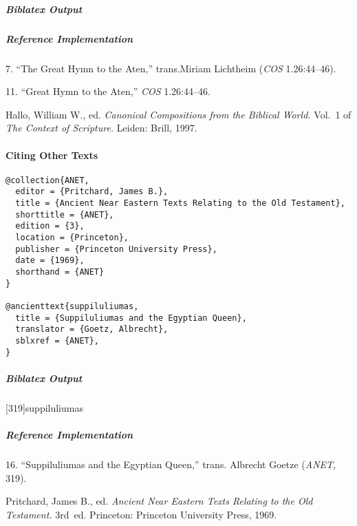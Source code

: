 \documentclass[a4paper]{article}
\newenvironment{biboutput}{%
  \subparagraph{Biblatex Output}
}{\color{black}}
\newenvironment{refimp}{%
  \subparagraph{Reference Implementation}
  \color{reference-colour}
  \rm
}{\par\color{black}}
\begin{document}
\begin{biboutput}
\end{biboutput}

\begin{refimp}
  \hspace*{\bibindent}7. “The Great Hymn to the Aten,” trans.\@ Miriam Lichtheim
  (\emph{COS} 1.26:44–46).

  \hspace*{\bibindent}11. “Great Hymn to the Aten,” \emph{COS} 1.26:44–46.

  \hangindent\bibindent Hallo, William W., ed. \emph{Canonical Compositions
  from the Biblical World.} Vol.~1 of \emph{The Context of Scripture.} Leiden:
  Brill, 1997.

\end{refimp}

\paragraph{Citing Other Texts}

\begin{lstlisting}
@collection{ANET,
  editor = {Pritchard, James B.},
  title = {Ancient Near Eastern Texts Relating to the Old Testament},
  shorttitle = {ANET},
  edition = {3},
  location = {Princeton},
  publisher = {Princeton University Press},
  date = {1969},
  shorthand = {ANET}
}

@ancienttext{suppiluliumas,
  title = {Suppiluliumas and the Egyptian Queen},
  translator = {Goetz, Albrecht},
  sblxref = {ANET},
}
\end{lstlisting}

\begin{biboutput}
  [319]{suppiluliumas}
\end{biboutput}

\begin{refimp}
  \hspace*{\bibindent}16. “Suppiluliumas and the Egyptian Queen,” trans.\@
  Albrecht Goetze (\emph{ANET,} 319).

  \hangindent\bibindent Pritchard, James B., ed. \emph{Ancient Near Eastern
  Texts Relating to the Old Testament.} 3rd~ed. Princeton: Princeton
  University Press, 1969.

\end{refimp}
\end{document}
